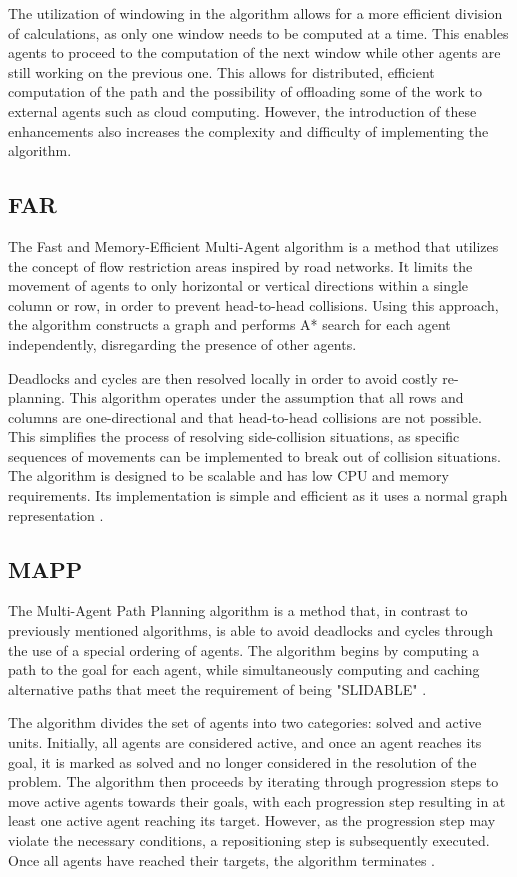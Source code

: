 The utilization of windowing in the algorithm allows for a more efficient division of calculations, as only one window needs to be computed at a time. This enables agents to proceed to the computation of the next window while other agents are still working on the previous one. This allows for distributed, efficient computation of the path and the possibility of offloading some of the work to external agents such as cloud computing. However, the introduction of these enhancements also increases the complexity and difficulty of implementing the algorithm.


\subsection{FAR}
The Fast and Memory-Efficient Multi-Agent algorithm is a method that utilizes the concept of flow restriction areas inspired by road networks. It limits the movement of agents to only horizontal or vertical directions within a single column or row, in order to prevent head-to-head collisions. Using this approach, the algorithm constructs a graph and performs A* search for each agent independently, disregarding the presence of other agents.

Deadlocks and cycles are then resolved locally in order to avoid costly re-planning. This algorithm operates under the assumption that all rows and columns are one-directional and that head-to-head collisions are not possible. This simplifies the process of resolving side-collision situations, as specific sequences of movements can be implemented to break out of collision situations. The algorithm is designed to be scalable and has low CPU and memory requirements. Its implementation is simple and efficient as it uses a normal graph representation \cite{far}.

\subsection{MAPP}
The Multi-Agent Path Planning algorithm is a method that, in contrast to previously mentioned algorithms, is able to avoid deadlocks and cycles through the use of a special ordering of agents. The algorithm begins by computing a path to the goal for each agent, while simultaneously computing and caching alternative paths that meet the requirement of being "SLIDABLE" \cite{mapp_algo}. 

The algorithm divides the set of agents into two categories: solved and active units. Initially, all agents are considered active, and once an agent reaches its goal, it is marked as solved and no longer considered in the resolution of the problem. The algorithm then proceeds by iterating through progression steps to move active agents towards their goals, with each progression step resulting in at least one active agent reaching its target. However, as the progression step may violate the necessary conditions, a repositioning step is subsequently executed. Once all agents have reached their targets, the algorithm terminates \cite{mapp_algo}.
